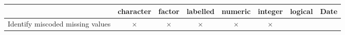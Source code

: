 \documentclass[]{article}
\begin{document}
\begin{longtable}[]{@{}lccccccc@{}}
\toprule
\begin{minipage}[b]{0.33\columnwidth}\raggedright\strut
~\strut
\end{minipage} & \begin{minipage}[b]{0.07\columnwidth}\centering\strut
character\strut
\end{minipage} & \begin{minipage}[b]{0.07\columnwidth}\centering\strut
factor\strut
\end{minipage} & \begin{minipage}[b]{0.07\columnwidth}\centering\strut
labelled\strut
\end{minipage} & \begin{minipage}[b]{0.07\columnwidth}\centering\strut
numeric\strut
\end{minipage} & \begin{minipage}[b]{0.07\columnwidth}\centering\strut
integer\strut
\end{minipage} & \begin{minipage}[b]{0.06\columnwidth}\centering\strut
logical\strut
\end{minipage} & \begin{minipage}[b]{0.06\columnwidth}\centering\strut
Date\strut
\end{minipage}\tabularnewline
\midrule
\endhead
\begin{minipage}[t]{0.33\columnwidth}\raggedright\strut
Identify miscoded missing values\strut
\end{minipage} & \begin{minipage}[t]{0.07\columnwidth}\centering\strut
\(\times\)\strut
\end{minipage} & \begin{minipage}[t]{0.07\columnwidth}\centering\strut
\(\times\)\strut
\end{minipage} & \begin{minipage}[t]{0.07\columnwidth}\centering\strut
\(\times\)\strut
\end{minipage} & \begin{minipage}[t]{0.07\columnwidth}\centering\strut
\(\times\)\strut
\end{minipage} & \begin{minipage}[t]{0.07\columnwidth}\centering\strut
\(\times\)\strut
\end{minipage} & \begin{minipage}[t]{0.06\columnwidth}\centering\strut
\strut
\end{minipage} & \begin{minipage}[t]{0.06\columnwidth}\centering\strut

\end{minipage}
\end{longtable}
\end{document}
